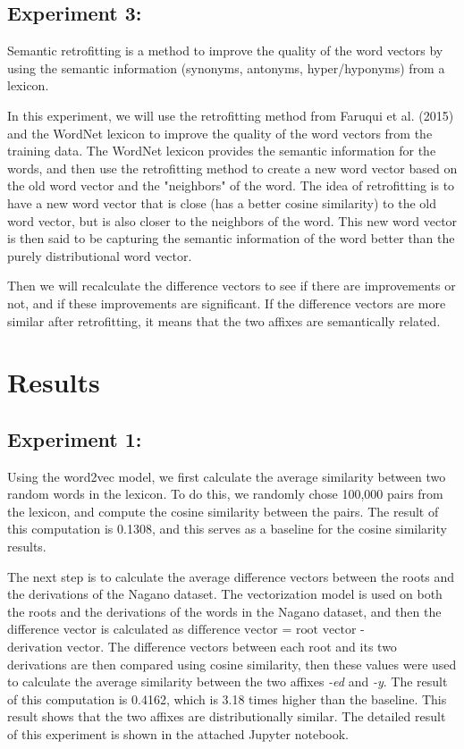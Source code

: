 \documentclass[12pt]{article}
\begin{document}
\subsection{Experiment 3:}
    Semantic retrofitting is a method to improve the quality of the word vectors by using the semantic information (synonyms, antonyms, hyper/hyponyms) from a lexicon. 

    In this experiment, we will use the retrofitting method from Faruqui et al. (2015) and the WordNet lexicon to improve the quality of the word vectors from the training data. The WordNet lexicon provides the semantic information for the words, and then use the retrofitting method to create a new word vector based on the old word vector and the "neighbors" of the word. The idea of retrofitting is to have a new word vector that is close (has a better cosine similarity) to the old word vector, but is also closer to the neighbors of the word. This new word vector is then said to be capturing the semantic information of the word better than the purely distributional word vector.

    Then we will recalculate the difference vectors to see if there are improvements or not, and if these improvements are significant. If the difference vectors are more similar after retrofitting, it means that the two affixes are semantically related.

\section{Results}
    \subsection{Experiment 1:}
    Using the word2vec model, we first calculate the average similarity between two random words in the lexicon. To do this, we randomly chose 100,000 pairs from the lexicon, and compute the cosine similarity between the pairs. The result of this computation is 0.1308, and this serves as a baseline for the cosine similarity results. 

    The next step is to calculate the average difference vectors between the roots and the derivations of the Nagano dataset. The vectorization model is used on both the roots and the derivations of the words in the Nagano dataset, and then the difference vector is calculated as $\text{difference vector}$ = $\text{root vector}$ - $\text{derivation vector}$. The difference vectors between each root and its two derivations are then compared using cosine similarity, then these values were used to calculate the average similarity between the two affixes \emph{-ed} and \emph{-y}. The result of this computation is 0.4162, which is 3.18 times higher than the baseline. This result shows that the two affixes are distributionally similar. The detailed result of this experiment is shown in the attached Jupyter notebook.
\end{document}
